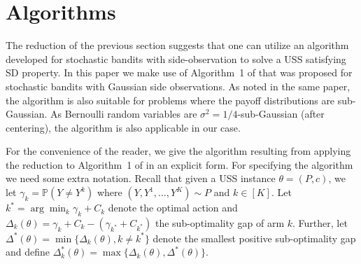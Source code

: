 \documentclass[11pt]{article} %
\newcommand{\todoc}[2][]{\todo[color=Apricot!20,size=\tiny,#1]{Cs: #2}}
\newcommand{\Prob}[1]{\mathbb{P}\left(#1\right)}
\begin{document}
\section{Algorithms}
\label{sec:Algo}
%
\newcommand{\set}{\leftarrow}
\newcommand{\hgamma}{\hat{\gamma}}
The reduction of the previous section suggests that one can  utilize 
an algorithm developed for stochastic bandits with side-observation to solve a USS satisfying SD property.
In this paper we make use of Algorithm~1 of \cite{WGySz:NIPS15}
that was proposed for stochastic bandits with Gaussian side observations. 
As noted in the same paper, the algorithm is also suitable for problems where the payoff distributions are sub-Gaussian.
As Bernoulli random variables are $\sigma^2=1/4$-sub-Gaussian (after centering),
the algorithm is also applicable in our case.

For the convenience of the reader, we give the algorithm resulting from applying the reduction to Algorithm~1 
of \cite{WGySz:NIPS15} in an explicit form.
For specifying the algorithm we need some extra notation.
Recall that given a USS instance $\theta = (P,c)$, we let $\gamma_k = \Prob{Y\ne Y^k}$ where $(Y,Y^1,\dots,Y^K)\sim P$ and $k\in [K]$. Let $k^*=\arg\min_k \gamma_k +C_k$ denote the optimal action and $\Delta_k(\theta)=\gamma_k+C_k-(\gamma_{k^*}+C_{k^*})$ the sub-optimality gap of arm $k$. Further, let $\Delta^*(\theta) = \min\{\Delta_k(\theta), k\neq k^* \}$ denote the smallest positive sub-optimality gap and define $\Delta_k^*(\theta) =\max\{\Delta_k(\theta), \Delta^*(\theta)\}$.
\end{document}

